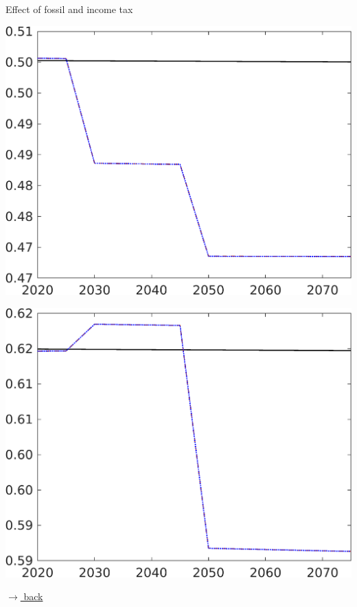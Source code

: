\documentclass[11pt,aspectratio=169]{beamer}
\begin{document}
\begin{frame}{ Effect of fossil and income tax}
\begin{minipage}[]{0.3\textwidth}
	\end{minipage}
	\begin{minipage}[]{0.3\textwidth}
		\includegraphics[width=1\textwidth]{../codding_model/own_basedOnFried/optimalPol_elastS_DisuSci/figures/all_1705/CompCounterFac_withLF_taufopt1_taulopt0_EY_spillover0_noskill0_sep1_BN0_ineq0_red0_xgrowth0_etaa0.79_lgd0.png}
	\end{minipage}
	\begin{minipage}[]{0.3\textwidth}
		\includegraphics[width=1\textwidth]{../codding_model/own_basedOnFried/optimalPol_elastS_DisuSci/figures/all_1705/CompCounterFac_withLF_taufopt1_taulopt0_CY_spillover0_noskill0_sep1_BN0_ineq0_red0_xgrowth0_etaa0.79_lgd0.png}
	\end{minipage}
	
	\vspace{-1mm}
	\hfill
	\hyperlink{effalloback}{\tiny{$\rightarrow$ back}} 
\end{frame}
\end{document}
